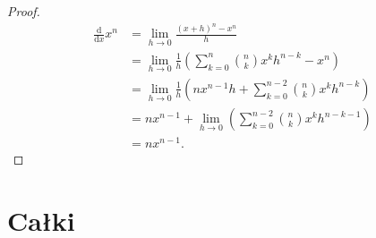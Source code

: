 \documentclass{createspace}
\begin{document}
\begin{proof}
\begin{align}
    \frac{\mathrm{d}}{\mathrm{d}x} x^n
    & = \lim_{h \to 0} \frac{(x+h)^n - x^n}{h} \\
    & = \lim_{h \to 0} \frac{1}{h} \left(\sum_{k=0}^n {n \choose k} x^k h^{n-k} - x^n \right) \\
    & = \lim_{h \to 0} \frac{1}{h} \left(nx^{n-1}h + \sum_{k=0}^{n-2} {n \choose k} x^k h^{n-k}\right) \\
    & = nx^{n-1} + \lim_{h \to 0} \left(\sum_{k=0}^{n-2} {n \choose k} x^k h^{n-k-1}\right) \\
    & = nx^{n-1}.
\end{align}
\end{proof}

\chapter{Całki}





\end{document}
